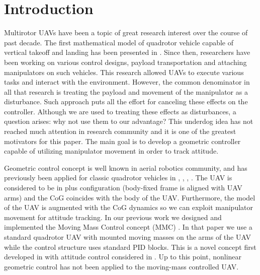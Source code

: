\section{Introduction}

Multirotor UAVs have been a topic of great research interest over the course of past decade. The first mathematical model of quadrotor vehicle capable of vertical takeoff and landing has been presented in \cite{hamel2002quad}. Since then, researchers have been working on various control designs, payload transportation and attaching manipulators on such vehicles. This research allowed UAVs to execute various tasks and interact with the environment. However, the common denominator in all that research is treating the payload and movement of the manipulator as a disturbance. Such approach puts all the effort for canceling these effects on the controller. Although we are used to treating these effects as disturbances, a question arises: why not use them to our advantage? This underdog idea has not reached much attention in research community and it is one of the greatest motivators for this paper. The main goal is to develop a geometric controller capable of utilizing manipulator movement in order to track attitude. 

Geometric control concept is well known in aerial robotics community, and has previously been applied for classic quadrotor vehicles in \cite{LeeClanak4}, \cite{LeeClanak3}, \cite{LeeClanak1}, \cite{Kumar}. The UAV is considered to be in plus configuration (body-fixed frame is aligned with UAV arms) and the CoG coincides with the body of the UAV. Furthermore, the model of the UAV is augmented with the CoG dynamics so we can exploit manipulator movement for attitude tracking. In our previous work we designed and implemented the Moving Mass Control concept (MMC) \cite{movingMass1}. In that paper we use a standard quadrotor UAV with mounted moving masses on the arms of the UAV while the control structure uses standard PID blocks. This is a novel concept first developed in \cite{movingMass2} with attitude control considered in \cite{movingMass3}. Up to this point, nonlinear geometric control has not been applied to the moving-mass controlled UAV.